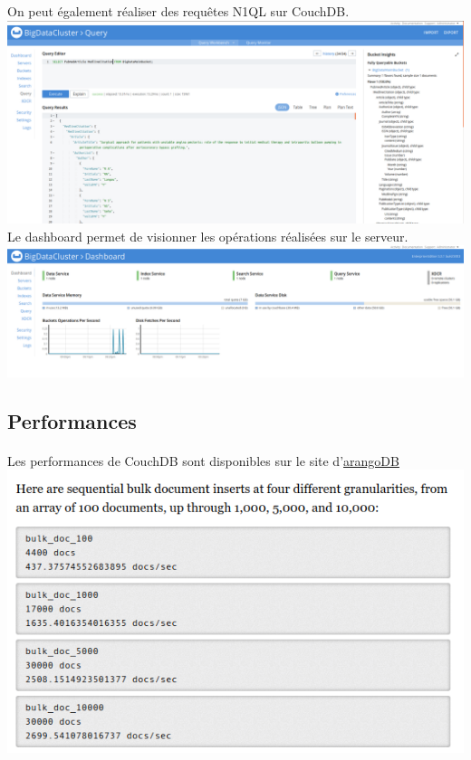 \documentclass{article}
\begin{document}
On peut également réaliser des requêtes N1QL sur CouchDB. \\

\includegraphics[scale=0.2]{couchBase/N1ql.png}\\

Le dashboard permet de visionner les opérations réalisées sur le serveur.\\

\includegraphics[scale=0.2]{couchBase/op.png}

\newpage

\subsection{Performances}
  \paragraph{} 
  Les performances de CouchDB sont disponibles sur le site d'\href{https://www.arangodb.com/2012/08/benchmarking-arangodb-and-couchdb/}{arangoDB}\\

  \includegraphics[scale=0.6]{couchBase/adb.png}\\
\end{document}

